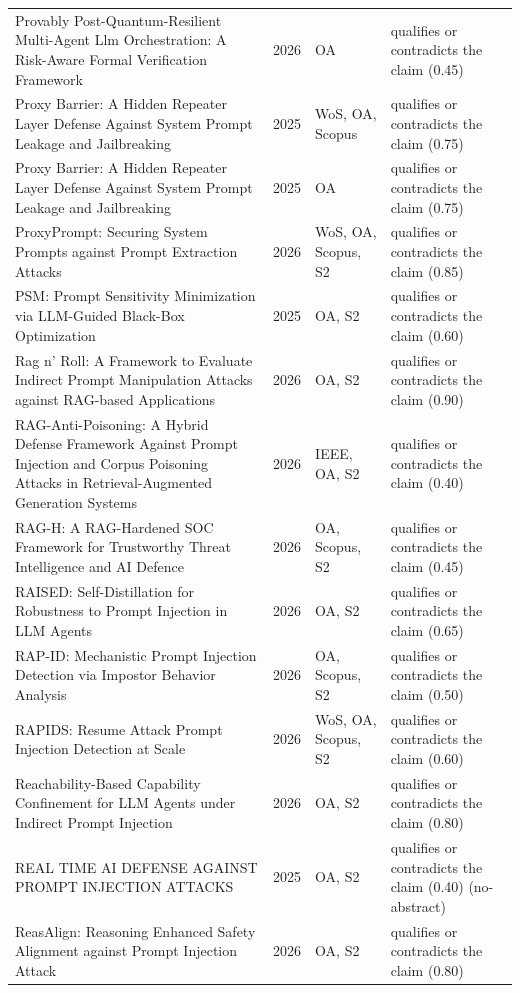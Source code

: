 \begin{longtable}{@{}%
  >{\raggedright\arraybackslash}p{}c%
  >{\raggedright\arraybackslash}p{}%
  >{\raggedright\arraybackslash}p{}@{}}
Provably Post-Quantum-Resilient Multi-Agent Llm Orchestration: A Risk-Aware Formal Verification Framework & 2026 & OA & qualifies or contradicts the claim (0.45) \\
Proxy Barrier: A Hidden Repeater Layer Defense Against System Prompt Leakage and Jailbreaking & 2025 & WoS, OA, Scopus & qualifies or contradicts the claim (0.75) \\
Proxy Barrier: A Hidden Repeater Layer Defense Against System Prompt Leakage and Jailbreaking & 2025 & OA & qualifies or contradicts the claim (0.75) \\
ProxyPrompt: Securing System Prompts against Prompt Extraction Attacks & 2026 & WoS, OA, Scopus, S2 & qualifies or contradicts the claim (0.85) \\
PSM: Prompt Sensitivity Minimization via LLM-Guided Black-Box Optimization & 2025 & OA, S2 & qualifies or contradicts the claim (0.60) \\
Rag n' Roll: A Framework to Evaluate Indirect Prompt Manipulation Attacks against RAG-based Applications & 2026 & OA, S2 & qualifies or contradicts the claim (0.90) \\
RAG-Anti-Poisoning: A Hybrid Defense Framework Against Prompt Injection and Corpus Poisoning Attacks in Retrieval-Augmented Generation Systems & 2026 & IEEE, OA, S2 & qualifies or contradicts the claim (0.40) \\
RAG-H: A RAG-Hardened SOC Framework for Trustworthy Threat Intelligence and AI Defence & 2026 & OA, Scopus, S2 & qualifies or contradicts the claim (0.45) \\
RAISED: Self-Distillation for Robustness to Prompt Injection in LLM Agents & 2026 & OA, S2 & qualifies or contradicts the claim (0.65) \\
RAP-ID: Mechanistic Prompt Injection Detection via Impostor Behavior Analysis & 2026 & OA, Scopus, S2 & qualifies or contradicts the claim (0.50) \\
RAPIDS: Resume Attack Prompt Injection Detection at Scale & 2026 & WoS, OA, Scopus, S2 & qualifies or contradicts the claim (0.60) \\
Reachability-Based Capability Confinement for LLM Agents under Indirect Prompt Injection & 2026 & OA, S2 & qualifies or contradicts the claim (0.80) \\
REAL TIME AI DEFENSE AGAINST PROMPT INJECTION ATTACKS & 2025 & OA, S2 & qualifies or contradicts the claim (0.40) (no-abstract) \\
ReasAlign: Reasoning Enhanced Safety Alignment against Prompt Injection Attack & 2026 & OA, S2 & qualifies or contradicts the claim (0.80) \\

\end{longtable}
